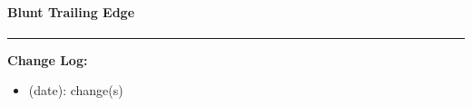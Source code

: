 \documentclass[]{article}
\newcommand{\vect}{\mathbf}
\begin{document}
\paragraph{Blunt Trailing Edge}
%
%
%
%



\newpage

{}


\vspace{1cm}
\hrule
\vspace{1cm}

\noindent  \textbf{Change Log:}

\begin{itemize}
	\item (date): change(s)
\end{itemize}
\end{document}
